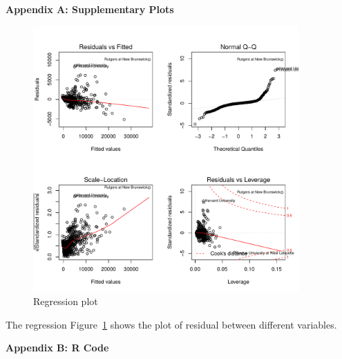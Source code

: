 \documentclass{article}\usepackage[]{graphicx}\usepackage[]{color}
\newenvironment{knitrout}{}{} %
\begin{document}
\newpage
\noindent \Large{{\bf Appendix A: Supplementary Plots}}
\begin{figure}[h!]
\begin{center}
%
%
\begin{knitrout}
\color{fgcolor}
\includegraphics[width=4in]{figure/unnamed-chunk-3-1} 

\end{knitrout}

\caption{Regression plot}
\label{regression}
\end{center}
\end{figure}

The regression Figure~\ref{regression} shows the plot of residual between different variables.


  \newpage
  \noindent \Large{{\bf Appendix B: R Code}}
  
\end{document}
